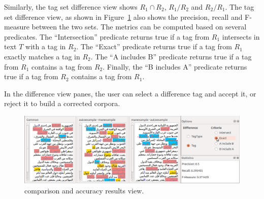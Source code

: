 Similarly, the tag set difference view shows $R_1\cap R_2$, $R_1/R_2$ and $R_2/R_1$. 
The tag set difference view, as shown in Figure~\ref{f:diff} also shows the precision, 
recall and F-measure between the two sets. 
The metrics can be computed based on several predicates. 
The ``Intersection'' predicate returns true if a tag from $R_1$ intersects in text $T$ 
with a tag in $R_2$. 
The ``Exact'' predicate returns true if a tag from $R_1$ exactly matches a tag
in $R_2$. 
The ``A includes B'' predicate returns true if a tag from $R_1$ contains a tag from $R_2$. 
Finally, the ``B includes A'' predicate returns true if a tag from $R_2$ contains 
a tag from $R_1$. 

In the difference view panes, the user can select a difference tag and accept it, or reject
it to build a corrected corpora.

\begin{figure}[tb!]
  \centering
  \includegraphics[width=\textwidth]{figures/diff}
  \caption{\framework comparison and accuracy results view.}
  \label{f:diff}
\end{figure}
